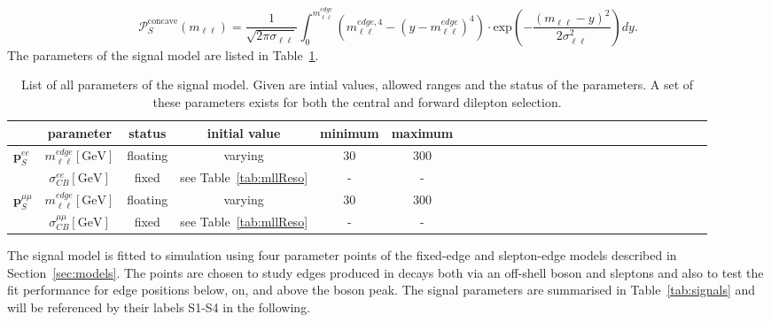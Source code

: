 \begin{equation}
 {\mathcal{P}}_{S}^{\text{concave}}(m_{\ell\ell}) = \frac{1}{\sqrt{2\pi\sigma_{\ell\ell}}} \int_{0}^{m_{\ell\ell}^{edge}} (m_{\ell\ell}^{edge,4} -(y-m_{\ell\ell}^{edge})^4) \cdot \textrm{exp}\left( -\frac{(m_{\ell\ell}-y)^2}{2\sigma_{\ell\ell}^{2}}\right) dy.
\end{equation}
The parameters of the signal model are listed in Table~\ref{tab:Fit_Par_Overview_Sig}.
\begin{table}[htbp]
\begin{center}
 \renewcommand{\arraystretch}{1.3}
 \caption{List of all parameters of the signal model. Given are intial values, allowed ranges and the status of the parameters. A set of these parameters exists for both the central and forward dilepton selection.\label{tab:Fit_Par_Overview_Sig}}
\begin{tabular}{l|c|c|c|c|ccccccccccccccccccccc}
& parameter & status & initial value & minimum & maximum \\ \hline
\multirow{2}{*}{$\mathbf{p}_{S}^{ee}$} & $m_{\ell\ell}^{edge} [\mathrm{GeV}]$ & floating & varying & 30 & 300 \\ 
& $\sigma_{CB}^{ee}  [\mathrm{GeV}]$ & fixed & see Table~\ref{tab:mllReso} & - & - \\ \hline
\multirow{2}{*}{$\mathbf{p}_{S}^{\mu\mu}$} & $m_{\ell\ell}^{edge} [\mathrm{GeV}]$ & floating & varying & 30 & 300 \\ 
& $\sigma_{CB}^{\mu\mu}  [\mathrm{GeV}]$ & fixed & see Table~\ref{tab:mllReso} & - & - \\
\end{tabular}

\end{center}
\end{table}

The signal model is fitted to simulation using four parameter points of the fixed-edge and slepton-edge models described in Section~\ref{sec:models}. The points are chosen to study edges produced in decays both via an off-shell \Z boson and sleptons and also to test the fit performance for edge positions below, on, and above the \Z boson peak. The signal parameters are summarised in Table~\ref{tab:signals} and will be referenced by their labels S1-S4 in the following.

